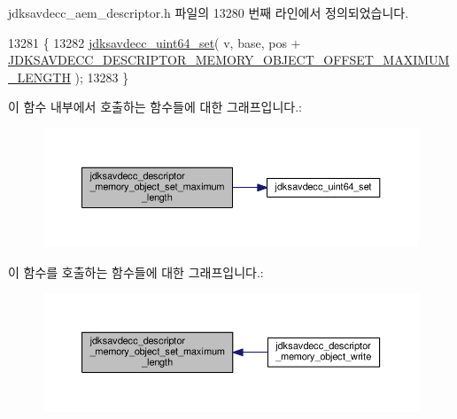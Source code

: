 jdksavdecc\+\_\+aem\+\_\+descriptor.\+h 파일의 13280 번째 라인에서 정의되었습니다.


\begin{DoxyCode}
13281 \{
13282     \hyperlink{group__endian_ga48c6225616d8c003861be5c423a36631}{jdksavdecc\_uint64\_set}( v, base, pos + 
      \hyperlink{group__descriptor__memory__object_ga63e6516d9c34b1773115cb87f21725c2}{JDKSAVDECC\_DESCRIPTOR\_MEMORY\_OBJECT\_OFFSET\_MAXIMUM\_LENGTH}
       );
13283 \}
\end{DoxyCode}


이 함수 내부에서 호출하는 함수들에 대한 그래프입니다.\+:
\nopagebreak
\begin{figure}[H]
\begin{center}
\leavevmode
\includegraphics[width=350pt]{group__descriptor__memory__object_ga523584c439c14c9121f4a0411d64b2d5_cgraph}
\end{center}
\end{figure}




이 함수를 호출하는 함수들에 대한 그래프입니다.\+:
\nopagebreak
\begin{figure}[H]
\begin{center}
\leavevmode
\includegraphics[width=350pt]{group__descriptor__memory__object_ga523584c439c14c9121f4a0411d64b2d5_icgraph}
\end{center}
\end{figure}


